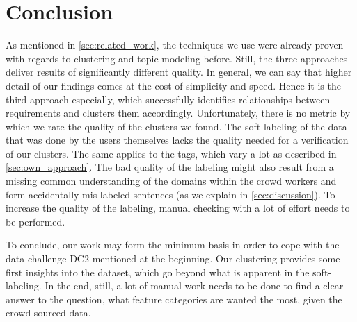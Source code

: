 \section{Conclusion} %
\label{sec:conclusion}
As mentioned in \autoref{sec:related_work}, the techniques we use were already proven with regards to clustering and topic modeling before. Still, the three approaches deliver results of significantly different quality. In general, we can say that higher detail of our findings comes at the cost of simplicity and speed. Hence it is the third approach especially, which successfully identifies relationships between requirements and clusters them accordingly. Unfortunately, there is no metric by which we rate the quality of the clusters we found. The soft labeling of the data that was done by the users themselves lacks the quality needed for a verification of our clusters. The same applies to the tags, which vary a lot as described in \autoref{sec:own_approach}. The bad quality of the labeling might also result from a missing common understanding of the domains within the crowd workers and form accidentally mis-labeled sentences (as we explain in \autoref{sec:discussion}). To increase the quality of the labeling, manual checking with a lot of effort needs to be performed.

To conclude, our work may form the minimum basis in order to cope with the data challenge DC2 mentioned at the beginning. Our clustering provides some first insights into the dataset, which go beyond what is apparent in the soft-labeling. In the end, still, a lot of manual work needs to be done to find a clear answer to the question, what feature categories are wanted the most, given the crowd sourced data.
